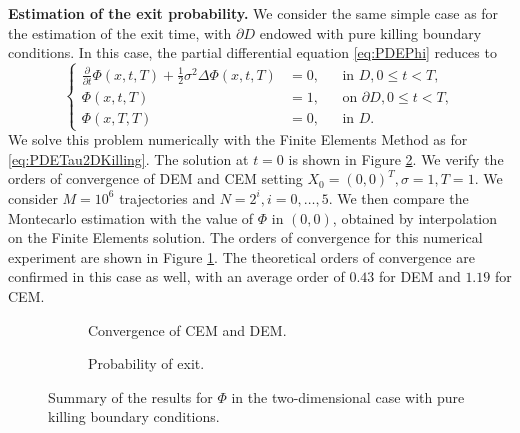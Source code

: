 
\vspace{2mm}
\noindent \textbf{Estimation of the exit probability.} We consider the same simple case as for the estimation of the exit time, with $\partial D$ endowed with pure killing boundary conditions. In this case, the partial differential equation \eqref{eq:PDEPhi} reduces to
\begin{equation}\label{eq:PDEPhi2DKilling}
	\left \{
  	\begin{aligned}
	\frac{\partial}{\partial t} \Phi(x,t,T) + \frac{1}{2} \sigma^2 \Delta \Phi(x,t,T) &= 0, && \text{in } D, 0 \leq t < T,\\
	\Phi(x,t,T) &= 1, && \text{on } \partial D, 0 \leq t < T,\\
	\Phi(x,T,T) &= 0, && \text{in } D.
  	\end{aligned} \right.
\end{equation}
We solve this problem numerically with the Finite Elements Method as for \eqref{eq:PDETau2DKilling}. The solution at $t = 0$ is shown in Figure \ref{fig:PhiExact2DKill}. We verify the orders of convergence of DEM and CEM setting $X_0 = (0,0)^T , \sigma = 1, T = 1$. We consider $M = 10^6$ trajectories and $N = 2^i,i=0,\dots,5$. We then compare the Montecarlo estimation with the value of $\Phi$ in $(0,0)$, obtained by interpolation on the Finite Elements solution. The orders of convergence for this numerical experiment are shown in Figure \ref{fig:KillTwoDPhi}. The theoretical orders of convergence are confirmed in this case as well, with an average order of $0.43$ for DEM and $1.19$ for CEM.

\begin{figure}[t]
    \centering
    \begin{subfigure}{0.49\linewidth}
        \centering
        \resizebox{1\linewidth}{!}{ }  
        \caption{Convergence of CEM and DEM.}
        \label{fig:KillTwoDPhi}
    \end{subfigure}
    \begin{subfigure}{0.49\linewidth}
        \centering
        \resizebox{1\linewidth}{!}{ }  
        \caption{Probability of exit.}
        \label{fig:PhiExact2DKill}
    \end{subfigure}    
    \caption{Summary of the results for $\Phi$ in the two-dimensional case with pure killing boundary conditions.}
    \label{fig:OrdersTwoDKillPhi}
\end{figure}

